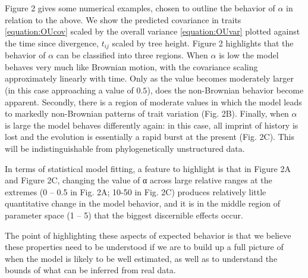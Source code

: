 \documentclass[a4paper,12pt]{article}
\begin{document}
Figure 2 gives some numerical examples, chosen to outline the behavior of $\alpha$ in relation to the above. We show the predicted covariance in traits \ref{equation:OUcov} scaled by the overall variance \ref{equation:OUvar} plotted against the time since divergence, $t_{ij}$ scaled by tree height. Figure 2 highlights that the behavior of $\alpha$ can be classified into three regions. When $\alpha$ is low the model behaves very much like Brownian motion, with the covariance scaling approximately linearly with time. Only as the value becomes moderately larger (in this case approaching a value of $0.5$), does the non-Brownian behavior become apparent. Secondly, there is a region of moderate values in which the model leads to markedly non-Brownian patterns of trait variation (Fig. 2B).  Finally, when $\alpha$ is large the model behaves differently again: in this case, all imprint of history is lost and the evolution is essentially a rapid burst at the present (Fig. 2C). This will be indistinguishable from phylogenetically unstructured data.  

In terms of statistical model fitting, a feature to highlight is that in Figure 2A and Figure 2C, changing the value of α across large relative ranges at the extremes (0 – 0.5 in Fig. 2A; 10-50 in Fig. 2C) produces relatively little quantitative change in the model behavior, and it is in the middle region of parameter space (1 – 5) that the biggest discernible effects occur.

The point of highlighting these aspects of expected behavior is that we believe these properties need to be understood if we are to build up a full picture of when the model is likely to be well estimated, as well as to understand the bounds of what can be inferred from real data. 
\end{document}
